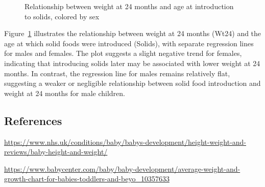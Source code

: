 \documentclass[
  letterpaper,
  DIV=11,
  numbers=noendperiod]{scrartcl}
\begin{document}
\begin{figure}


\caption{\label{fig-scat-wt24-solids}Relationship between weight at 24
months and age at introduction to solids, colored by sex}

\end{figure}%

Figure~\ref{fig-scat-wt24-solids} illustrates the relationship between
weight at 24 months (Wt24) and the age at which solid foods were
introduced (Solids), with separate regression lines for males and
females. The plot suggests a slight negative trend for females,
indicating that introducing solids later may be associated with lower
weight at 24 months. In contrast, the regression line for males remains
relatively flat, suggesting a weaker or negligible relationship between
solid food introduction and weight at 24 months for male children.

\subsection{References}\label{references}

\url{https://www.nhs.uk/conditions/baby/babys-development/height-weight-and-reviews/baby-height-and-weight/}

\url{https://www.babycenter.com/baby/baby-development/average-weight-and-growth-chart-for-babies-toddlers-and-beyo_10357633}
\end{document}
